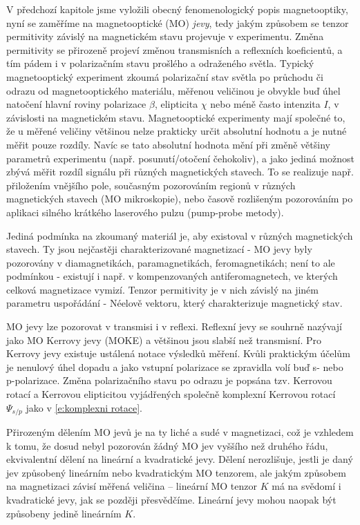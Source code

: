 V předchozí kapitole jsme vyložili obecný fenomenologický popis magnetooptiky, nyní se zaměříme na magnetooptické (MO) \emph{jevy}, tedy jakým způsobem se tenzor permitivity závislý na magnetickém stavu projevuje v experimentu.
Změna permitivity se přirozeně projeví změnou transmisních a reflexních koeficientů, a tím pádem i v polarizačním stavu prošlého a odraženého světla.
Typický magnetooptický experiment zkoumá polarizační stav světla po průchodu či odrazu od magnetooptického materiálu, měřenou veličinou je obvykle buď úhel natočení hlavní roviny polarizace $\beta$, elipticita $\chi$ nebo méně často intenzita $I$, v závislosti na magnetickém stavu.
Magnetooptické experimenty mají společné to, že u měřené veličiny většinou nelze prakticky určit absolutní hodnotu a je nutné měřit pouze rozdíly.
Navíc se tato absolutní hodnota mění při změně většiny parametrů experimentu (např. posunutí/otočení čehokoliv), a jako jediná možnost zbývá měřit rozdíl signálu při různých magnetických stavech. To se realizuje např. přiložením vnějšího pole, současným pozorováním regionů v různých magnetických stavech (MO mikroskopie), nebo časově rozlišeným pozorováním po aplikaci silného krátkého laserového pulzu (pump-probe metody).

Jediná podmínka na zkoumaný materiál je, aby existoval v různých magnetických stavech.
Ty jsou nejčastěji charakterizované magnetizací - MO jevy byly pozorovány v diamagnetikách, paramagnetikách, feromagnetikách; není to ale podmínkou - existují i např. v kompenzovaných antiferomagnetech\cite{SaidlOpticalNeel}, ve kterých celková magnetizace vymizí. Tenzor permitivity je v nich závislý na jiném parametru uspořádání - Néelově vektoru, který charakterizuje magnetický stav.

MO jevy lze pozorovat v transmisi i v reflexi.
Reflexní jevy se souhrně nazývají jako MO Kerrovy jevy (MOKE) a většinou jsou slabší než transmisní.
Pro Kerrovy jevy existuje ustálená notace výsledků měření.
Kvůli praktickým účelům je nenulový úhel dopadu a jako vstupní polarizace se zpravidla volí buď s- nebo p-polarizace. Změna polarizačního stavu po odrazu je popsána tzv. Kerrovou rotací a Kerrovou elipticitou vyjádřených společně komplexní Kerrovou rotací $\Psi_{s/p}$ jako v \eqref{e:komplexni rotace}.


Přirozeným dělením MO jevů je na ty liché a sudé v magnetizaci, což je vzhledem k tomu, že dosud nebyl pozorován žádný MO jev vyššího než druhého řádu, ekvivalentní dělení na lineární a kvadratické jevy.
Dělení nerozlišuje, jestli je daný jev způsobený lineárním nebo kvadratickým MO tenzorem, ale jakým způsobem na magnetizaci závisí měřená veličina -- lineární MO tenzor $K$ má na svědomí i kvadratické jevy, jak se později přesvědčíme.
Lineární jevy mohou naopak být způsobeny jedině lineárním $K$.


